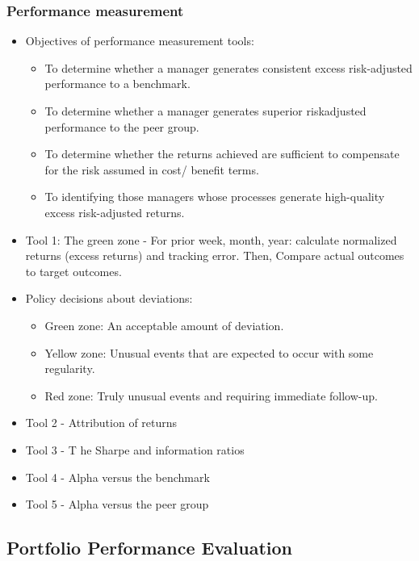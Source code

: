 \subsubsection{Performance measurement}
\begin{itemize}
\item Objectives of performance measurement tools:
    \begin{itemize}
    \item To determine whether a manager generates consistent excess risk-adjusted performance to a benchmark.
    \item To determine whether a manager generates superior riskadjusted performance to the peer group.
    \item To determine whether the returns achieved are sufficient to compensate for the risk assumed in cost/ benefit terms.
    \item To identifying those managers whose processes generate high-quality excess risk-adjusted returns.
    \end{itemize}
\item Tool 1: The green zone - For prior week, month, year: calculate normalized returns (excess returns) and tracking error. Then, Compare actual outcomes to target outcomes.
\item Policy decisions about deviations:
    \begin{itemize}
    \item Green zone: An acceptable amount of deviation.
    \item Yellow zone: Unusual events that are expected to occur with some regularity.
    \item Red zone: Truly unusual events and requiring immediate follow-up.
    \end{itemize}
\item Tool 2 - Attribution of returns
\item Tool 3 - T he Sharpe and information ratios
\item Tool 4 - Alpha versus the benchmark
\item Tool 5 - Alpha versus the peer group
\end{itemize}




\subsection{Portfolio Performance Evaluation}



